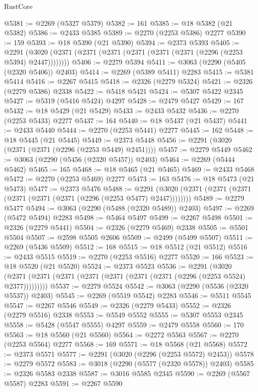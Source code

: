 \begin{lexlean}{RustCore}
\begin{coremodule}
@5381 := @2269 (@5327 @5379)
@5382 := 161
@5385 := @18 @5382 (@21 @5382)
@5386 := @2433 @5385
@5389 := @2270 (@2253 @5386) @2277
@5390 := 159
@5393 := @18 @5390 (@21 @5390)
@5394 := @2373 @5393
@5405 := @2291 (@3020 (@2371 (@2371 (@2371 (@2371 (@2371 (@2371 (@2296 (@2253 @5394) @2447))))))))
@5406 := @2279 @5394
@5411 := @3063 (@2290 (@5405 (@2320 @5406)) @2403)
@5414 := @2269 (@5389 @5411) @2283
@5415 := @5381 @5414
@5416 := @2267 @5415
@5418 := @2326 (@2279 @5324)
@5421 := @2326 (@2279 @5386) @2338
@5422 := @5418 @5421
@5424 := @5307 @5422 @2345
@5427 := @5319 (@5416 @5424) @4297
@5428 := @2479 @5427
@5429 := 167
@5432 := @18 @5429 (@21 @5429)
@5433 := @2433 @5432
@5436 := @2270 (@2253 @5433) @2277
@5437 := 164
@5440 := @18 @5437 (@21 @5437)
@5441 := @2433 @5440
@5444 := @2270 (@2253 @5441) @2277
@5445 := 162
@5448 := @18 @5445 (@21 @5445)
@5449 := @2373 @5448
@5456 := @2291 (@3020 (@2371 (@2371 (@2296 (@2253 @5449) @2451))))
@5457 := @2279 @5449
@5462 := @3063 (@2290 (@5456 (@2320 @5457)) @2403)
@5464 := @2269 (@5444 @5462)
@5465 := 165
@5468 := @18 @5465 (@21 @5465)
@5469 := @2433 @5468
@5472 := @2270 (@2253 @5469) @2277
@5473 := 163
@5476 := @18 @5473 (@21 @5473)
@5477 := @2373 @5476
@5488 := @2291 (@3020 (@2371 (@2371 (@2371 (@2371 (@2371 (@2371 (@2296 (@2253 @5477) @2447))))))))
@5489 := @2279 @5477
@5494 := @3063 (@2290 (@5488 (@2320 @5489)) @2403)
@5497 := @2269 (@5472 @5494) @2283
@5498 := @5464 @5497
@5499 := @2267 @5498
@5501 := @2326 (@2279 @5441)
@5504 := @2326 (@2279 @5469) @2338
@5505 := @5501 @5504
@5507 := @2598 @5505 @2606
@5509 := @2499 (@5499 @5507)
@5511 := @2269 (@5436 @5509)
@5512 := 168
@5515 := @18 @5512 (@21 @5512)
@5516 := @2433 @5515
@5519 := @2270 (@2253 @5516) @2277
@5520 := 166
@5523 := @18 @5520 (@21 @5520)
@5524 := @2373 @5523
@5536 := @2291
    (@3020 (@2371 (@2371 (@2371 (@2371 (@2371 (@2371 (@2371 (@2296 (@2253 @5524) @2377)))))))))
@5537 := @2279 @5524
@5542 := @3063 (@2290 (@5536 (@2320 @5537)) @2403)
@5545 := @2269 (@5519 @5542) @2283
@5546 := @5511 @5545
@5547 := @2267 @5546
@5549 := @2326 (@2279 @5433)
@5552 := @2326 (@2279 @5516) @2338
@5553 := @5549 @5552
@5555 := @5307 @5553 @2345
@5558 := @5428 (@5547 @5555) @4297
@5559 := @2479 @5558
@5560 := 170
@5563 := @18 @5560 (@21 @5560)
@5564 := @2272 @5563
@5567 := @2270 (@2253 @5564) @2277
@5568 := 169
@5571 := @18 @5568 (@21 @5568)
@5572 := @2373 @5571
@5577 := @2291 (@3020 (@2296 (@2253 @5572) @2453))
@5578 := @2279 @5572
@5583 := @3018 (@2290 (@5577 (@2320 @5578)) @2403)
@5585 := @2326 @5583 @2338
@5587 := @3016 @5585 @2345
@5590 := @2269 (@5567 @5587) @2283
@5591 := @2267 @5590

\end{coremodule}
\end{lexlean}
